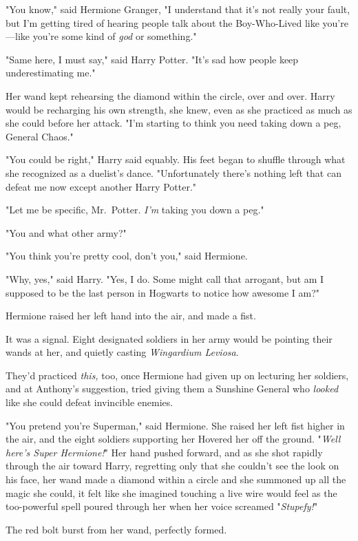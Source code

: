 "You know," said Hermione Granger, "I understand that it's not really your 
fault, but I'm getting tired of hearing people talk about the Boy-Who-Lived 
like you're---like you're some kind of \emph{god} or something."

"Same here, I must say," said Harry Potter. "It's sad how people keep 
underestimating me."

Her wand kept rehearsing the diamond within the circle, over and over. Harry 
would be recharging his own strength, she knew, even as she practiced as much 
as she could before her attack. "I'm starting to think you need taking down a 
peg, General Chaos."

"You could be right," Harry said equably. His feet began to shuffle through 
what she recognized as a duelist's dance. "Unfortunately there's nothing left 
that can defeat me now except another Harry Potter."

"Let me be specific, Mr.~Potter. \emph{I'm} taking you down a peg."

"You and what other army?"

"You think you're pretty cool, don't you," said Hermione.

"Why, yes," said Harry. "Yes, I do. Some might call that arrogant, but am I 
supposed to be the last person in Hogwarts to notice how awesome I am?"

Hermione raised her left hand into the air, and made a fist.

It was a signal. Eight designated soldiers in her army would be pointing their 
wands at her, and quietly casting \emph{Wingardium Leviosa}.

They'd practiced \emph{this,} too, once Hermione had given up on lecturing her 
soldiers, and at Anthony's suggestion, tried giving them a Sunshine General who 
\emph{looked} like she could defeat invincible enemies.

"You pretend you're Superman," said Hermione. She raised her left fist higher 
in the air, and the eight soldiers supporting her Hovered her off the ground. 
"\emph{Well here's Super Hermione!}" Her hand pushed forward, and as she shot 
rapidly through the air toward Harry, regretting only that she couldn't see the 
look on his face, her wand made a diamond within a circle and she summoned up 
all the magic she could, it felt like she imagined touching a live wire would 
feel as the too-powerful spell poured through her when her voice screamed 
"\emph{Stupefy!}"

The red bolt burst from her wand, perfectly formed.


